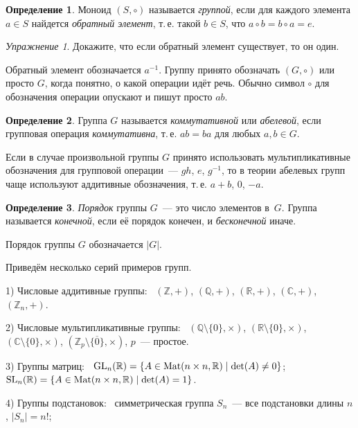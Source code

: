 \documentclass[a4paper,10pt]{amsart}
\def\Mat{{\rm Mat}}%
\def\CC{{\mathbb C}}%
\def\ZZ{{\mathbb Z}}%
\def\RR{{\mathbb R}}%
\def\QQ{{\mathbb Q}}%
\def\GL{{\rm GL}}%
\def\SL{{\rm SL}}%
\def\GL{{\rm GL}}%
\def\Mat{{\rm Mat}}
\def\GL{{\rm GL}}
\def\SL{{\rm SL}}
\def\GL{{\rm GL}}
\theoremstyle{definition}
\newtheorem{definition}{Определение}
\theoremstyle{remark}
\newtheorem{exc}{Упражнение}
\begin{document}
\begin{definition}
Моноид $(S,\circ)$ называется {\it группой}, если для каждого
элемента $a\in S$ найдется {\it обратный элемент}, т.\,е. такой
$b\in S$, что $a\circ b = b\circ a= e$.
\end{definition}

\begin{exc}
Докажите, что если обратный элемент существует, то он один.
\end{exc}

Обратный элемент обозначается $a^{-1}$. Группу принято обозначать
$(G,\circ)$ или просто $G$, когда понятно, о какой операции идёт
речь. Обычно символ $\circ$ для обозначения операции опускают и
пишут просто $ab$.

\begin{definition}
Группа $G$ называется {\it коммутативной} или {\it абелевой}, если
групповая операция {\it коммутативна}, т.\,е. $ab=ba$ для любых
$a,b\in G$.
\end{definition}

Если в случае произвольной группы $G$ принято использовать
мультипликативные обозначения для групповой операции~--- $gh$, $e$,
$g^{-1}$, то в теории абелевых групп чаще используют аддитивные
обозначения, т.\,е. $a+b$, $0$, $-a$.

\begin{definition}
{\it Порядок} группы $G$~--- это число элементов в~$G$. Группа
называется {\it конечной}, если её порядок конечен, и {\it
бесконечной} иначе.
\end{definition}

Порядок группы $G$ обозначается $|G|$.

\smallskip

Приведём несколько серий примеров групп.

\smallskip

1) Числовые аддитивные группы: \ $(\ZZ,+)$, $(\QQ,+)$, $(\RR,+)$,
$(\CC,+)$, $(\ZZ_n,+)$.

\smallskip

2) Числовые мультипликативные группы: \
$(\QQ\setminus\{0\},\times)$, $(\RR\setminus\{0\},\times)$,
$(\CC\setminus\{0\},\times)$,
$(\ZZ_p\setminus\{\overline{0}\},\times)$, $p$~--- простое.

3) Группы матриц: \ $\GL_n(\RR)=\{A\in\Mat(n\times n, \RR) \mid
\det(A)\ne 0\}$;  \ $\SL_n(\RR)=\{A\in\Mat(n\times n, \RR) \mid
\det(A)=1\}$.

4) Группы подстановок: \ симметрическая группа $S_n$~--- все
подстановки длины $n$, $|S_n|=n!$;
\end{document}
